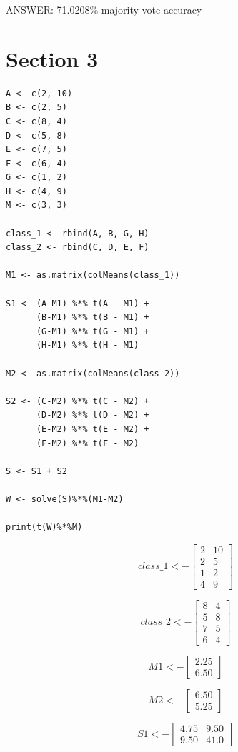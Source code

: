 \documentclass{report}
\begin{document}
ANSWER: 71.0208\% majority vote accuracy

\chapter{Section 3}

\begin{verbatim}
A <- c(2, 10)
B <- c(2, 5)
C <- c(8, 4)
D <- c(5, 8)
E <- c(7, 5)
F <- c(6, 4)
G <- c(1, 2)
H <- c(4, 9)
M <- c(3, 3)

class_1 <- rbind(A, B, G, H)
class_2 <- rbind(C, D, E, F)

M1 <- as.matrix(colMeans(class_1))

S1 <- (A-M1) %*% t(A - M1) +
      (B-M1) %*% t(B - M1) +
      (G-M1) %*% t(G - M1) +
      (H-M1) %*% t(H - M1)

M2 <- as.matrix(colMeans(class_2))

S2 <- (C-M2) %*% t(C - M2) +
      (D-M2) %*% t(D - M2) +
      (E-M2) %*% t(E - M2) +
      (F-M2) %*% t(F - M2)

S <- S1 + S2

W <- solve(S)%*%(M1-M2)

print(t(W)%*%M)

\end{verbatim}


\[
  class\_1 <- 
  \begin{bmatrix}
    2 & 10 \\
    2 & 5 \\
    1 & 2 \\
    4 & 9
  \end{bmatrix}
\]

\[
  class\_2 <- 
  \begin{bmatrix}
    8 & 4 \\
    5 & 8 \\
    7 & 5 \\
    6 & 4
  \end{bmatrix}
\]

\[
  M1 <- 
  \begin{bmatrix}
    2.25 \\
    6.50
  \end{bmatrix}
\]

\[
  M2 <- 
  \begin{bmatrix}
    6.50 \\
    5.25
  \end{bmatrix}
\]

\[
  S1 <- 
  \begin{bmatrix}
    4.75 & 9.50 \\
    9.50 & 41.0
  \end{bmatrix}
\]
\end{document}
